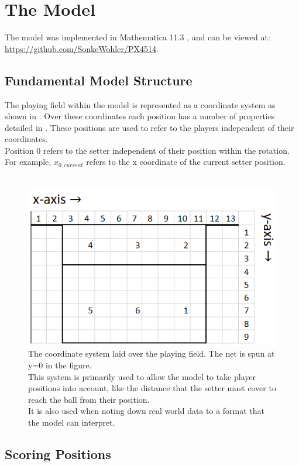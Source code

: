 \documentclass[main.tex]{subfiles}
\begin{document}
  \section{The Model}
    
    The model was implemented in Mathematica 11.3 \cite{wolfram}, and can be viewed at: \url{https://github.com/SonkeWohler/PX4514}.
    
    \subsection{Fundamental Model Structure}
      
      The playing field within the model is represented as a coordinate system as shown in . Over these coordinates each position has a number of properties detailed in . These positions are used to refer to the players independent of their coordinates. \\
      Position 0 refers to the setter independent of their position within the rotation. For example, \(x_{0,current}\) refers to the x coordinate of the current setter position.
      \\\\
      
      
      
      \begin{figure}
        \centering
        \includegraphics[width=0.5\linewidth]{figures/playingFieldGridLabelled}
        \caption{The coordinate system laid over the playing field. The net is spun at y=0 in the figure. \\
          This system is primarily used to allow the model to take player positions into account, like the distance that the setter must cover to reach the ball from their position. \\
          It is also used when noting down real world data to a format that the model can interpret.}
        \label{fig:field}
      \end{figure}
      
    \subsection{Scoring Positions}
      
\end{document}
